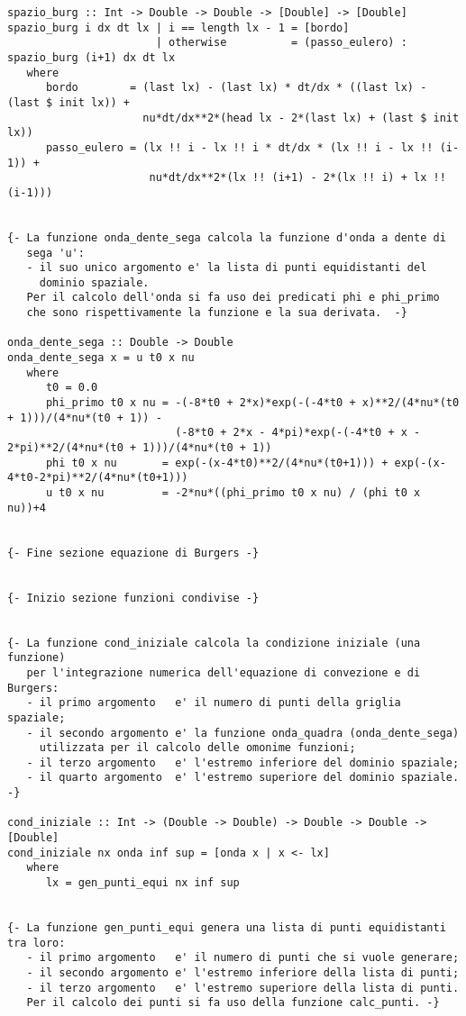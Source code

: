 \begin{verbatim}
spazio_burg :: Int -> Double -> Double -> [Double] -> [Double]
spazio_burg i dx dt lx | i == length lx - 1 = [bordo]
                       | otherwise          = (passo_eulero) : spazio_burg (i+1) dx dt lx
   where
      bordo        = (last lx) - (last lx) * dt/dx * ((last lx) - (last $ init lx)) +
                     nu*dt/dx**2*(head lx - 2*(last lx) + (last $ init lx))
      passo_eulero = (lx !! i - lx !! i * dt/dx * (lx !! i - lx !! (i-1)) + 
                      nu*dt/dx**2*(lx !! (i+1) - 2*(lx !! i) + lx !! (i-1)))


{- La funzione onda_dente_sega calcola la funzione d'onda a dente di 
   sega 'u':
   - il suo unico argomento e' la lista di punti equidistanti del 
     dominio spaziale. 
   Per il calcolo dell'onda si fa uso dei predicati phi e phi_primo
   che sono rispettivamente la funzione e la sua derivata.  -}

onda_dente_sega :: Double -> Double
onda_dente_sega x = u t0 x nu
   where
      t0 = 0.0                                                                              
      phi_primo t0 x nu = -(-8*t0 + 2*x)*exp(-(-4*t0 + x)**2/(4*nu*(t0 + 1)))/(4*nu*(t0 + 1)) - 
                          (-8*t0 + 2*x - 4*pi)*exp(-(-4*t0 + x - 2*pi)**2/(4*nu*(t0 + 1)))/(4*nu*(t0 + 1))       
      phi t0 x nu       = exp(-(x-4*t0)**2/(4*nu*(t0+1))) + exp(-(x-4*t0-2*pi)**2/(4*nu*(t0+1)))
      u t0 x nu         = -2*nu*((phi_primo t0 x nu) / (phi t0 x nu))+4


{- Fine sezione equazione di Burgers -}


{- Inizio sezione funzioni condivise -}


{- La funzione cond_iniziale calcola la condizione iniziale (una funzione)
   per l'integrazione numerica dell'equazione di convezione e di Burgers:
   - il primo argomento   e' il numero di punti della griglia spaziale;
   - il secondo argomento e' la funzione onda_quadra (onda_dente_sega) 
     utilizzata per il calcolo delle omonime funzioni;
   - il terzo argomento   e' l'estremo inferiore del dominio spaziale;
   - il quarto argomento  e' l'estremo superiore del dominio spaziale. -}

cond_iniziale :: Int -> (Double -> Double) -> Double -> Double -> [Double]
cond_iniziale nx onda inf sup = [onda x | x <- lx]
   where
      lx = gen_punti_equi nx inf sup


{- La funzione gen_punti_equi genera una lista di punti equidistanti tra loro:
   - il primo argomento   e' il numero di punti che si vuole generare;
   - il secondo argomento e' l'estremo inferiore della lista di punti;
   - il terzo argomento   e' l'estremo superiore della lista di punti.
   Per il calcolo dei punti si fa uso della funzione calc_punti. -}


\end{verbatim}
